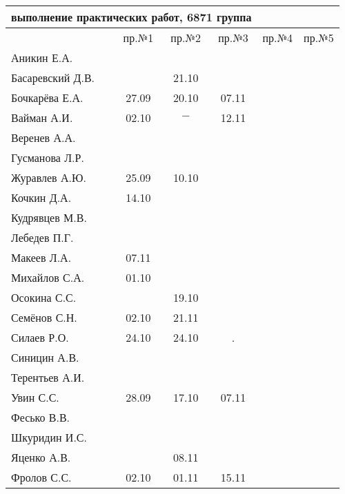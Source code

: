 \documentclass[a4paper,landscape,11pt]{article}
\begin{document}
\begin{tabular}{l|ccccc}
\multicolumn{4}{c}{выполнение практических работ, 6871 группа} \\
\toprule
& пр.№1 & пр.№2  &  пр.№3 &  пр.№4 &  пр.№5\\
\midrule
Аникин Е.А.     &     &     &     & &\\    
Басаревский Д.В.&     &21.10&     & &\\
Бочкарёва Е.А.  &27.09&20.10&07.11& &\\
Вайман А.И.     &02.10&$-$  &12.11& &\\
Веренев А.А.    &     &     &     & &\\
Гусманова Л.Р.  &     &     &     & &\\
Журавлев А.Ю.   &25.09&10.10&     & &\\
Кочкин Д.А.     &14.10&     &     & &\\
Кудрявцев М.В.  &     &     &     & &\\
Лебедев П.Г.    &     &     &     & &\\
Макеев Л.А.     &07.11&     &     & &\\
Михайлов С.А.   &01.10&     &     & &\\
Осокина С.С.    &     &19.10&     & &\\
Семёнов С.Н.    &02.10&21.11&     & &\\
Силаев Р.О.     &24.10&24.10&  .  & &\\
Синицин А.В.    &     &     &     & &\\
Терентьев А.И.  &     &     &     & &\\
Увин С.С.       &28.09&17.10&07.11& &\\
Фесько В.В.     &     &     &     & &\\
Шкуридин И.С.   &     &     &     & &\\
Яценко А.В.     &     &08.11&     & &\\
Фролов С.С.     &02.10&01.11&15.11& &\\
\bottomrule
\end{tabular}
\end{document}
